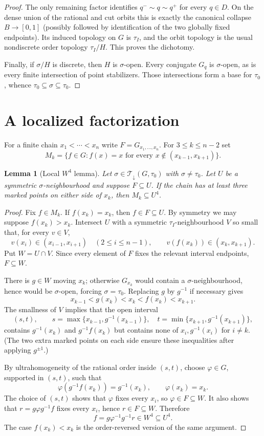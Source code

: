 \documentclass[11pt]{article}
\newtheorem{lemma}{Lemma}
\newcommand{\Tdown}{\mathcal T_{\downarrow}}
\begin{document}
\begin{proof}
The only remaining factor identifies $q^-\sim q\sim q^+$ for every
$q\in D$.  On the dense union of the rational and cut orbits this is exactly
the canonical collapse $B\to[0,1]$ (possibly followed by identification of
the two globally fixed endpoints).  Its induced topology on $G$ is
$\tau_I$, and the orbit topology is the usual nondiscrete order topology
$\tau_I/H$.  This proves the dichotomy.

Finally, if $\sigma/H$ is discrete, then $H$ is $\sigma$-open.  Every
conjugate $G_q$ is $\sigma$-open, as is every finite intersection of point
stabilizers.  Those intersections form a base for $\tau_0$, whence
$\tau_0\subseteq\sigma\subseteq\tau_0$.
\end{proof}

\section*{A localized factorization}

For a finite chain $x_1<\cdots<x_n$ write
$F=G_{x_1,\ldots,x_n}$.  For $3\leq k\leq n-2$ set
\[
 M_k=\{f\in G: f(x)=x\text{ for every }x\notin(x_{k-1},x_{k+1})\}.
\]

\begin{lemma}[Local $W^4$ lemma]\label{lem:w4}
Let $\sigma\in\Tdown(G,\tau_0)$ with $\sigma\ne\tau_0$.  Let $U$ be a
symmetric $\sigma$-neighbourhood and suppose $F\subseteq U$.  If the chain
has at least three marked points on either side of $x_k$, then
$M_k\subseteq U^4$.
\end{lemma}

\begin{proof}
Fix $f\in M_k$.  If $f(x_k)=x_k$, then $f\in F\subseteq U$.  By symmetry we
may suppose $f(x_k)>x_k$.  Intersect $U$ with a symmetric
$\tau_I$-neighbourhood $V$ so small that, for every $v\in V$,
\[
 v(x_i)\in(x_{i-1},x_{i+1})\quad(2\leq i\leq n-1),
 \qquad v(f(x_k))\in(x_k,x_{k+1}).
\]
Put $W=U\cap V$.  Since every element of $F$ fixes the relevant interval
endpoints, $F\subseteq W$.

There is $g\in W$ moving $x_k$; otherwise $G_{x_k}$ would contain a
$\sigma$-neighbourhood, hence would be $\sigma$-open, forcing
$\sigma=\tau_0$.  Replacing $g$ by $g^{-1}$ if necessary gives
\[
 x_{k-1}<g(x_k)<x_k<f(x_k)<x_{k+1}.
\]
The smallness of $V$ implies that the open interval
\[
 (s,t),\qquad
 s=\max\{x_{k-1},g^{-1}(x_{k-1})\},\quad
 t=\min\{x_{k+1},g^{-1}(x_{k+1})\},
\]
contains $g^{-1}(x_k)$ and $g^{-1}f(x_k)$ but contains none of
$x_i,g^{-1}(x_i)$ for $i\ne k$.  (The two extra marked points on each side
ensure these inequalities after applying $g^{\pm1}$.)

By ultrahomogeneity of the rational order inside $(s,t)$, choose
$\varphi\in G$, supported in $(s,t)$, such that
\[
 \varphi(g^{-1}f(x_k))=g^{-1}(x_k),\qquad \varphi(x_k)=x_k.
\]
The choice of $(s,t)$ shows that $\varphi$ fixes every $x_i$, so
$\varphi\in F\subseteq W$.  It also shows that
$r=g\varphi g^{-1}f$ fixes every $x_i$, hence $r\in F\subseteq W$.  Therefore
\[
 f=g\varphi^{-1}g^{-1}r\in W^4\subseteq U^4.
\]
The case $f(x_k)<x_k$ is the order-reversed version of the same argument.
\end{proof}
\end{document}
